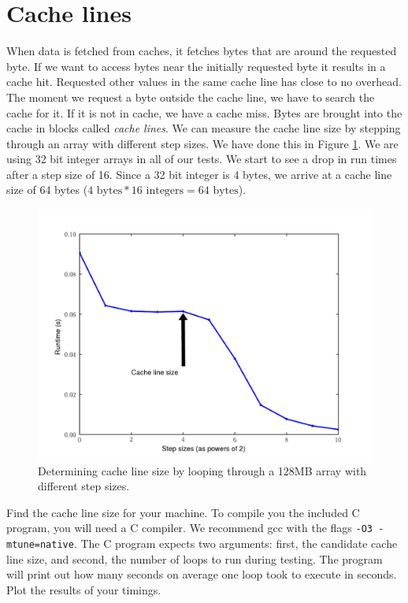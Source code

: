 \section*{Cache lines}
When data is fetched from caches, it fetches bytes that are around the requested byte.  
If we want to access bytes near the initially requested byte it results in a cache hit.
Requested other values in the same cache line has close to no overhead.
The moment we request a byte outside the cache line, we have to search the cache for it.  If it is not in cache, we have a cache miss.
Bytes are brought into the cache in blocks called \emph{cache lines}.
We can measure the cache line size by stepping through an array with different step sizes.
We have done this in Figure \ref{fig:linesize}.  We are using 32 bit integer arrays in all of our tests.
We start to see a drop in run times after a step size of 16.
Since a 32 bit integer is 4 bytes, we arrive at a cache line size of 64 bytes ($4 \mbox{~bytes} * 16 \mbox{~integers} = 64 \mbox{~bytes}$).
\begin{figure}[h]
\centering
\includegraphics[width=\textwidth]{cache_line.pdf}
\caption{Determining cache line size by looping through a 128MB array with different step sizes.}
\label{fig:linesize}
\end{figure}


\begin{problem}
Find the cache line size for your machine.
To compile you the included C program, you will need a C compiler.
We recommend gcc with the flags \texttt{-O3 -mtune=native}.
The C program expects two arguments: first, the candidate cache line size, and second, the number of loops to run during testing.
The program will print out how many seconds on average one loop took to execute in seconds.
Plot the results of your timings.
\label{prob:cacheline}
\end{problem}

